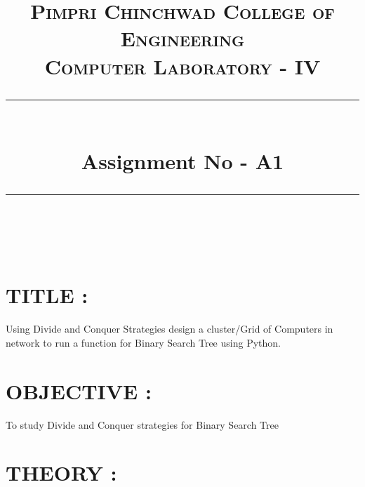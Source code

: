 \documentclass{article}
\title{
	\normalfont \normalsize 
	\textsc{Pimpri Chinchwad College of Engineering \\ 
		Computer Laboratory - IV} \\
	[10pt] 
	\rule{\linewidth}{0.5pt} \\[6pt] 
	\huge Assignment No - A1 \\
	\rule{\linewidth}{2pt}  \\[10pt]
}
\author{}
\date{\normalsize}
\begin{document}
\maketitle

\begin{center}
\end{center}


\section{TITLE : } Using Divide and Conquer Strategies design a cluster/Grid of Computers in network to run a function for Binary Search Tree using Python.

\section{OBJECTIVE : }  To study Divide and Conquer strategies for Binary Search Tree

\section{THEORY : }
\end{document}
